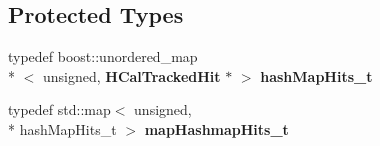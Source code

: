 \subsection*{Protected Types}
\begin{DoxyCompactItemize}
\item 
typedef boost\-::unordered\-\_\-map\\*
$<$ unsigned, {\bf H\-Cal\-Tracked\-Hit} $\ast$ $>$ {\bfseries hash\-Map\-Hits\-\_\-t}\label{classHCalTrackingNNProcessor_a53a207437efcb088881b0b46030b6ee3}

\item 
typedef std\-::map$<$ unsigned, \\*
hash\-Map\-Hits\-\_\-t $>$ {\bfseries map\-Hashmap\-Hits\-\_\-t}\label{classHCalTrackingNNProcessor_ac66df3d2b2f2ebc6abb91541b33c8c01}

\end{DoxyCompactItemize}
